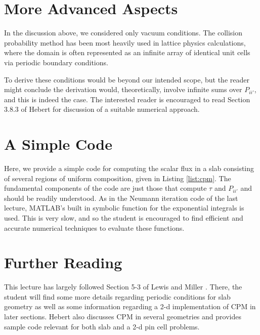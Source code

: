 \section*{More Advanced Aspects}

In the discussion above, we considered only vacuum conditions.  The collision probability method has been most heavily used in lattice physics calculations, where the domain is often represented as an infinite array of identical unit cells via periodic boundary conditions.  

To derive these conditions would be beyond our intended scope, but the reader might conclude the derivation would, theoretically, involve infinite sums over $P_{ii'}$, and this is indeed the case.  The interested reader is encouraged to read Section 3.8.3 of Hebert \cite{hebert2009arp} for discussion of a suitable numerical approach.

\section*{A Simple Code}

Here, we provide a simple code for computing the scalar flux in a slab consisting of several regions of uniform composition, given in Listing \ref{list:cpm}.  The fundamental components of the code are just those that compute $\tau$ and $P_{ii'}$ and should be readily understood.  As in the Neumann iteration code of the last lecture, MATLAB's built in symbolic function for the exponential integrals is used.  This is very slow, and so the student is encouraged to find efficient and accurate numerical techniques to evaluate these functions.  



\section*{Further Reading}

This lecture has largely followed Section 5-3 of Lewis and Miller \cite{lewis1993cmn}.  There, the student will find some more details regarding periodic conditions for slab geometry as well as some information regarding a 2-d implementation of CPM in later sections.  Hebert \cite{hebert2009arp} also discusses CPM in several geometries and provides sample code relevant for both slab and a 2-d pin cell problems.

